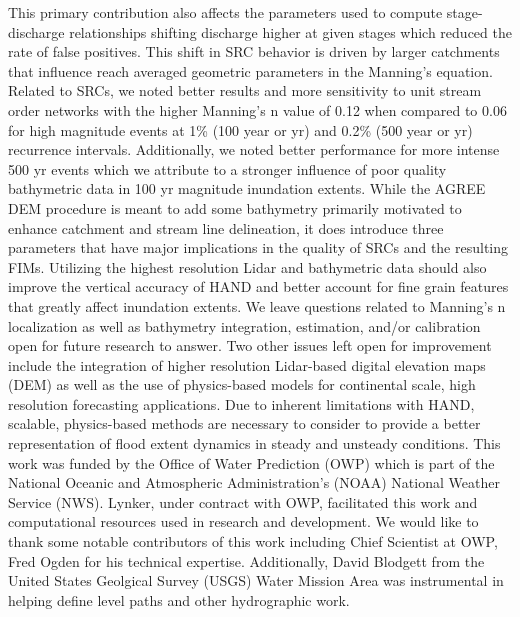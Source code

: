 \documentclass[draft]{dependencies/agujournal2019}
\begin{document}
This primary contribution also affects the parameters used to compute stage-discharge relationships shifting discharge higher at given stages which reduced the rate of false positives.
This shift in SRC behavior is driven by larger catchments that influence reach averaged geometric parameters in the Manning's equation.
Related to SRCs, we noted better results and more sensitivity to unit stream order networks with the higher Manning's n value of 0.12 when compared to 0.06 for high magnitude events at 1\% (100 year or yr) and 0.2\% (500 year or yr) recurrence intervals.
Additionally, we noted better performance for more intense 500 yr events which we attribute to a stronger influence of poor quality bathymetric data in 100 yr magnitude inundation extents.
While the AGREE DEM procedure is meant to add some bathymetry primarily motivated to enhance catchment and stream line delineation, it does introduce three parameters that have major implications in the quality of SRCs and the resulting FIMs.
Utilizing the highest resolution Lidar and bathymetric data should also improve the vertical accuracy of HAND and better account for fine grain features that greatly affect inundation extents.
We leave questions related to Manning's n localization as well as bathymetry integration, estimation, and/or calibration open for future research to answer.
Two other issues left open for improvement include the integration of higher resolution Lidar-based digital elevation maps (DEM) as well as the use of physics-based models for continental scale, high resolution forecasting applications.
Due to inherent limitations with HAND, scalable, physics-based methods are necessary to consider to provide a better representation of flood extent dynamics in steady and unsteady conditions.
\clearpage %
\acknowledgments
%
This work was funded by the Office of Water Prediction (OWP) which is part of the National Oceanic and Atmospheric Administration's (NOAA) National Weather Service (NWS).
Lynker, under contract with OWP, facilitated this work and computational resources used in research and development.
We would like to thank some notable contributors of this work including Chief Scientist at OWP, Fred Ogden for his technical expertise.
Additionally, David Blodgett from the United States Geolgical Survey (USGS) Water Mission Area was instrumental in helping define level paths and other hydrographic work.
\end{document}
